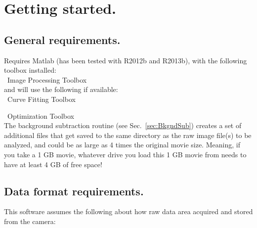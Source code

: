\documentclass[11pt]{article}
\begin{document}
\clearpage

\section{Getting started.}

\subsection{General requirements.}

Requires Matlab (has been tested with R2012b and R2013b), with the following toolbox installed:\\

\noindent \textbullet~Image Processing Toolbox\\

\noindent and will use the following if available:\\

\noindent \textbullet~Curve Fitting Toolbox

\noindent \textbullet~Optimization Toolbox\\


\noindent The background subtraction routine (see Sec.~\ref{sec:BkgndSub}) creates a set of additional files that get saved to the same directory as the raw image file(s) to be analyzed, and could be as large as 4 times the original movie size.  Meaning, if you take a 1 GB movie, whatever drive you load this 1 GB movie from needs to have at least 4 GB of free space! 

\subsection{Data format requirements.}

This software assumes the following about how raw data area acquired and stored from the camera:\\
\end{document}

